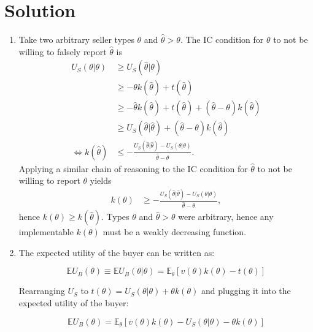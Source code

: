 \documentclass[a4paper]{article}
\newif\ifsolutions
\begin{document}
\ifsolutions
\section*{Solution}
\begin{enumerate}
	\item Take two arbitrary seller types $\theta$ and $\hat{\theta}>\theta$. The IC condition for $\theta$ to not be willing to falsely report $\hat{\theta}$ is
	\begin{align*}
		U_S(\theta|\theta) &\geq U_S (\hat{\theta}|\theta)
		\\
		&\geq -\theta k(\hat{\theta}) + t(\hat{\theta})
		\\
		&\geq -\hat{\theta} k(\hat{\theta}) + t(\hat{\theta}) + (\hat{\theta}-\theta) k(\hat{\theta})
		\\
		&\geq U_S (\hat{\theta}|\hat{\theta}) + (\hat{\theta}-\theta) k(\hat{\theta})
		\\
		\iff k(\hat{\theta}) &\leq - \frac{U_S(\hat{\theta}|\hat{\theta})-U_S(\theta|\theta)}{\hat{\theta}-\theta}.
	\end{align*}
	Applying a similar chain of reasoning to the IC condition for $\hat{\theta}$ to not be willing to report $\theta$ yields
	\begin{align*}
		k({\theta}) &\geq - \frac{U_S(\hat{\theta}|\hat{\theta})-U_S(\theta|\theta)}{\hat{\theta}-\theta},
	\end{align*}
	hence $k(\theta) \geq k(\hat{\theta})$. Types $\theta$ and $\hat{\theta}>\theta$ were arbitrary, hence any implementable $k(\theta)$ must be a weakly decreasing function.
	
	
	\item The expected utility of the buyer can be written as:
	
	$$ \mathbb{E}U_B(\theta) \equiv \mathbb{E}U_B(\theta|\theta) = \mathbb{E}_\theta[v(\theta)k(\theta)-t(\theta)]$$
	
	Rearranging $U_S$ to $t(\theta)=U_S(\theta|\theta)+\theta k(\theta)$ and plugging it into the expected utility of the buyer:
	
	$$ \mathbb{E}U_B(\theta)=\mathbb{E}_\theta[v(\theta)k(\theta)-U_S(\theta|\theta)-\theta k(\theta)]$$
	

\end{enumerate}
\end{document}
